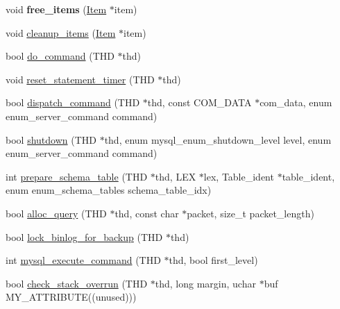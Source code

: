 \begin{DoxyCompactItemize}
\item 
\mbox{\label{group__Runtime__Environment_gaf3ca455b4e3e525a662ef572d60f9290}} 
void {\bfseries free\+\_\+items} (\mbox{\hyperlink{classItem}{Item}} $\ast$item)
\item 
void \mbox{\hyperlink{group__Runtime__Environment_gaf7bccb54271a0546d92f2bc732abf3d1}{cleanup\+\_\+items}} (\mbox{\hyperlink{classItem}{Item}} $\ast$item)
\item 
bool \mbox{\hyperlink{group__Runtime__Environment_ga331df424a7892fbbad536f0f3a7b18f6}{do\+\_\+command}} (T\+HD $\ast$thd)
\item 
void \mbox{\hyperlink{group__Runtime__Environment_ga3632047b55b1b225c609f0f9ff46250a}{reset\+\_\+statement\+\_\+timer}} (T\+HD $\ast$thd)
\item 
bool \mbox{\hyperlink{group__Runtime__Environment_gabf07206792036bfb47e5bb8eb0f20bc4}{dispatch\+\_\+command}} (T\+HD $\ast$thd, const C\+O\+M\+\_\+\+D\+A\+TA $\ast$com\+\_\+data, enum enum\+\_\+server\+\_\+command command)
\item 
bool \mbox{\hyperlink{group__Runtime__Environment_ga12e1f9234a9969980b924de2e3fe487d}{shutdown}} (T\+HD $\ast$thd, enum mysql\+\_\+enum\+\_\+shutdown\+\_\+level level, enum enum\+\_\+server\+\_\+command command)
\item 
int \mbox{\hyperlink{group__Runtime__Environment_gaa5de0e97014b9b2e757a145f30eb7efb}{prepare\+\_\+schema\+\_\+table}} (T\+HD $\ast$thd, L\+EX $\ast$lex, Table\+\_\+ident $\ast$table\+\_\+ident, enum enum\+\_\+schema\+\_\+tables schema\+\_\+table\+\_\+idx)
\item 
bool \mbox{\hyperlink{group__Runtime__Environment_ga8b3573b4adc788a4eeddbf6d1cb12582}{alloc\+\_\+query}} (T\+HD $\ast$thd, const char $\ast$packet, size\+\_\+t packet\+\_\+length)
\item 
bool \mbox{\hyperlink{group__Runtime__Environment_gabbd6de1ff28f3b8c16300a74d412b3b3}{lock\+\_\+binlog\+\_\+for\+\_\+backup}} (T\+HD $\ast$thd)
\item 
int \mbox{\hyperlink{group__Runtime__Environment_gac7751d9816645a7a68e879596ee7e558}{mysql\+\_\+execute\+\_\+command}} (T\+HD $\ast$thd, bool first\+\_\+level)
\item 
bool \mbox{\hyperlink{group__Runtime__Environment_ga9a660aa2196395412bc0c5c8e7baa33a}{check\+\_\+stack\+\_\+overrun}} (T\+HD $\ast$thd, long margin, uchar $\ast$buf M\+Y\+\_\+\+A\+T\+T\+R\+I\+B\+U\+TE((unused)))
\item 

\end{DoxyCompactItemize}
